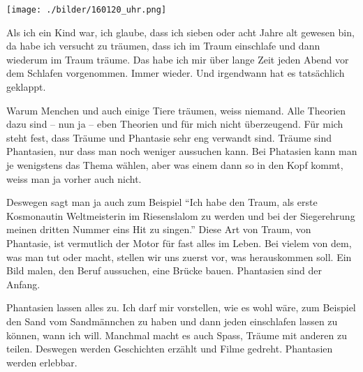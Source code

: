 \thispagestyle{empty}
\begin{center}
\texttt{[image: ./bilder/160120\_uhr.png]}
\end{center}
\vskip 2cm
{\Huge\color{farbe}\hfill{}}
\newpage
\lettrine[lines=2, lhang=.2, loversize=.25, lraise=0.05, findent=0.1em,
nindent=0em]{A}{}ls ich ein Kind war, ich glaube, dass ich sieben oder acht
Jahre alt gewesen bin, da habe ich versucht zu träumen, dass ich im Traum
einschlafe und dann wiederum im Traum träume. Das habe ich mir über lange Zeit
jeden Abend vor dem Schlafen vorgenommen. Immer wieder. Und irgendwann hat es
tatsächlich geklappt.

Warum Menchen und auch einige Tiere träumen, weiss niemand. Alle Theorien dazu
sind -- nun ja -- eben Theorien und für mich nicht überzeugend. Für mich steht
fest, dass Träume und Phantasie sehr eng verwandt sind. Träume sind Phantasien,
nur dass man noch weniger aussuchen kann. Bei Phatasien kann man je wenigstens
das Thema wählen, aber was einem dann so in den Kopf kommt, weiss man ja vorher
auch nicht. 

Deswegen sagt man ja auch zum Beispiel \enquote{Ich habe den Traum, als erste
Kosmonautin Weltmeisterin im Riesenslalom zu werden und bei der Siegerehrung meinen
dritten Nummer eins Hit zu singen.} Diese Art von Traum, von Phantasie, ist
vermutlich der Motor für fast alles im Leben. Bei vielem von dem, was man tut oder macht,
stellen wir uns zuerst vor, was herauskommen soll. Ein Bild malen, den Beruf
aussuchen, eine Brücke bauen. Phantasien sind der Anfang.

Phantasien lassen alles zu. Ich darf mir vorstellen, wie es wohl wäre, zum
Beispiel den Sand vom Sandmännchen zu haben und dann jeden einschlafen lassen
zu können, wann ich will. Manchmal macht es auch Spass, Träume mit anderen zu
teilen. Deswegen werden Geschichten erzählt und Filme gedreht. Phantasien
werden erlebbar. 
\vfill


